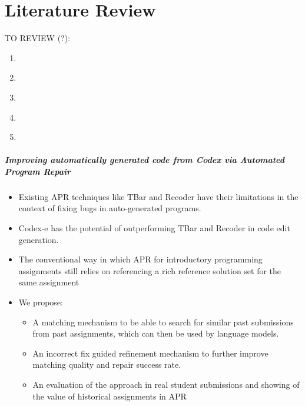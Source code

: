 \chapter{Literature Review}

TO REVIEW (?):

\begin{enumerate}
    \item~\cite{ahmed2022verifix}
    \item~\cite{chen2021evaluating}
    \item~\cite{haldeman2021automated}
    \item~\cite{hu2019re}
    \item~\cite{zhang2022repairing}
\end{enumerate}

\paragraph{Improving automatically generated code from Codex via Automated Program Repair}

\cite{fan2022improving}

\begin{itemize}
    \item Existing APR techniques like TBar and Recoder have their limitations in the context of
          fixing bugs in auto-generated programs.
    \item Codex-e has the potential of outperforming TBar and Recoder in code edit generation.
    \item The conventional way in which APR for introductory programming assignments still relies
          on referencing a rich reference solution set for the same assignment
    \item We propose:
    \begin{itemize}
        \item A matching mechanism to be able to search for similar past submissions from past
              assignments, which can then be used by language models.
        \item An incorrect fix guided refinement mechanism to further improve matching quality
              and repair success rate.
        \item An evaluation of the approach in real student submissions and showing of the value
              of historical assignments in APR
    \end{itemize}
\end{itemize}